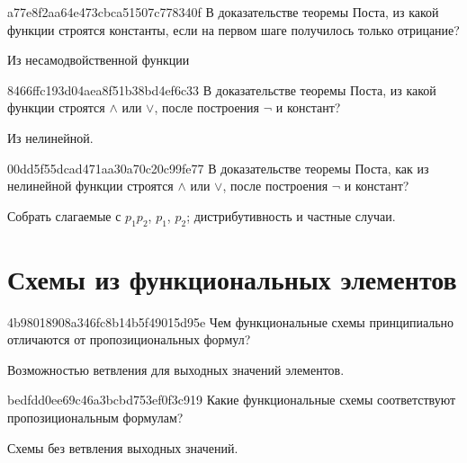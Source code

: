 \begin{note}{a77e8f2aa64e473cbca51507c778340f}
    В доказательстве теоремы Поста, из какой функции строятся константы, если на первом шаге получилось только отрицание?

    \begin{cloze}{1}
        Из несамодвойственной функции
    \end{cloze}
\end{note}

\begin{note}{8466ffc193d04aea8f51b38bd4ef6c33}
    В доказательстве теоремы Поста, из какой функции строятся \({ \land }\) или \({ \lor }\), после построения \({ \lnot }\) и констант?

    \begin{cloze}{1}
        Из нелинейной.
    \end{cloze}
\end{note}

\begin{note}{00dd5f55dcad471aa30a70c20c99fe77}
    В доказательстве теоремы Поста, как из нелинейной функции строятся \({ \land }\) или \({ \lor }\), после построения \({ \lnot }\) и констант?

    \begin{cloze}{1}
        Собрать слагаемые с \({ p_1p_2 }\),\: \({ p_1 }\),\: \({ p_2 }\); дистрибутивность и частные случаи.
    \end{cloze}
\end{note}

\section{Схемы из функциональных элементов}
\begin{note}{4b98018908a346fc8b14b5f49015d95e}
    Чем функциональные схемы принципиально отличаются от пропозициональных формул?

    \begin{cloze}{1}
        Возможностью ветвления для выходных значений элементов.
    \end{cloze}
\end{note}

\begin{note}{bedfdd0ee69c46a3bcbd753ef0f3c919}
    Какие функциональные схемы соответствуют пропозициональным формулам?

    \begin{cloze}{1}
        Схемы без ветвления выходных значений.
    \end{cloze}
\end{note}

